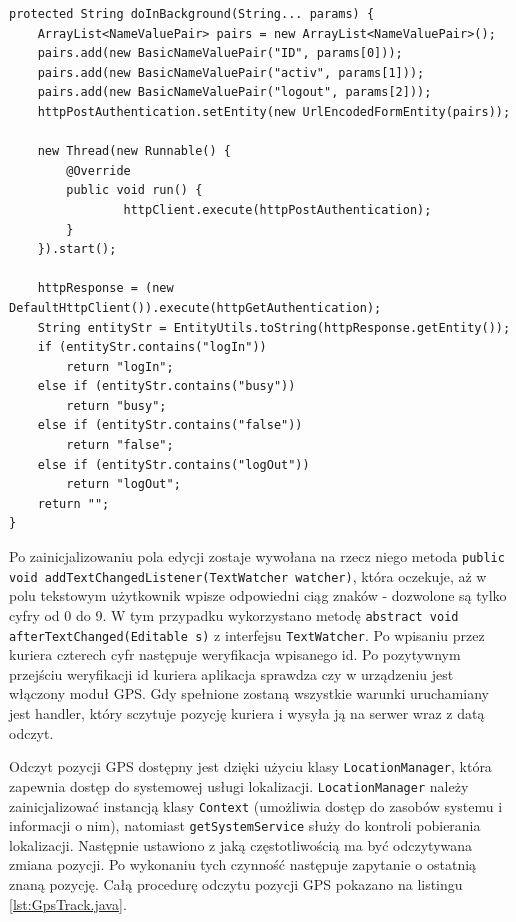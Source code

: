 \documentclass[eng,printmode,oneside]{mgr}
\begin{document}
\begin{lstlisting}[caption=klasa
AuthenticationDeliverer metoda
doInBackground,label=lst:AuthentictionDeliverer.java]
protected String doInBackground(String... params) {
	ArrayList<NameValuePair> pairs = new ArrayList<NameValuePair>();
	pairs.add(new BasicNameValuePair("ID", params[0]));
	pairs.add(new BasicNameValuePair("activ", params[1]));
	pairs.add(new BasicNameValuePair("logout", params[2]));
	httpPostAuthentication.setEntity(new UrlEncodedFormEntity(pairs));
	
	new Thread(new Runnable() {
		@Override
		public void run() {
				httpClient.execute(httpPostAuthentication);
		}
	}).start();
	
	httpResponse = (new DefaultHttpClient()).execute(httpGetAuthentication);
	String entityStr = EntityUtils.toString(httpResponse.getEntity());
	if (entityStr.contains("logIn"))
		return "logIn";
	else if (entityStr.contains("busy"))
		return "busy";
	else if (entityStr.contains("false"))
		return "false";
	else if (entityStr.contains("logOut"))
		return "logOut";
	return "";
}
\end{lstlisting}

Po zainicjalizowaniu pola edycji zostaje wywołana na rzecz niego metoda
\texttt{public void addTextChangedListener(TextWatcher watcher)}, która
oczekuje, aż w polu tekstowym użytkownik wpisze odpowiedni ciąg znaków -
dozwolone są tylko cyfry od 0 do 9. W tym przypadku wykorzystano metodę
\texttt{abstract void afterTextChanged(Editable s)} z interfejsu
\texttt{TextWatcher}. Po wpisaniu przez kuriera czterech cyfr następuje weryfikacja wpisanego id. Po pozytywnym
przejściu weryfikacji id kuriera aplikacja sprawdza czy w urządzeniu jest
włączony moduł GPS. Gdy spełnione zostaną wszystkie warunki uruchamiany jest
handler, który sczytuje pozycję kuriera i wysyła ją na serwer wraz z datą odczyt. 

Odczyt pozycji GPS dostępny jest dzięki użyciu klasy \texttt{LocationManager},
która zapewnia dostęp do systemowej usługi lokalizacji. \texttt{LocationManager}
należy zainicjalizować instancją klasy \texttt{Context} (umożliwia dostęp do
zasobów systemu i informacji o nim), natomiast \texttt{getSystemService} służy
do kontroli pobierania lokalizacji. Następnie ustawiono z jaką częstotliwością
ma być odczytywana zmiana pozycji. Po wykonaniu tych czynność następuje
zapytanie o ostatnią znaną pozycję. Całą procedurę odczytu pozycji GPS pokazano
na listingu \ref{lst:GpsTrack.java}.
\end{document}
